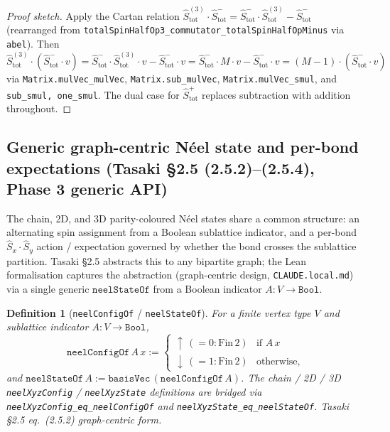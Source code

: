 \documentclass[a4paper,11pt]{article}
\newtheorem{definition}[theorem]{Definition}
\begin{document}
\begin{proof}[Proof sketch]
Apply the Cartan relation $\hat S_{\mathrm{tot}}^{(3)} \cdot \hat
S_{\mathrm{tot}}^{-} = \hat S_{\mathrm{tot}}^{-} \cdot \hat
S_{\mathrm{tot}}^{(3)} - \hat S_{\mathrm{tot}}^{-}$ (rearranged from
\texttt{totalSpinHalfOp3\_commutator\_totalSpinHalfOpMinus} via
\texttt{abel}).  Then $\hat S_{\mathrm{tot}}^{(3)} \cdot
(\hat S_{\mathrm{tot}}^{-} \cdot v)
= \hat S_{\mathrm{tot}}^{-} \cdot \hat S_{\mathrm{tot}}^{(3)} \cdot v
- \hat S_{\mathrm{tot}}^{-} \cdot v
= \hat S_{\mathrm{tot}}^{-} \cdot M \cdot v
- \hat S_{\mathrm{tot}}^{-} \cdot v
= (M-1) \cdot (\hat S_{\mathrm{tot}}^{-} \cdot v)$ via
\texttt{Matrix.mulVec\_mulVec}, \texttt{Matrix.sub\_mulVec},
\texttt{Matrix.mulVec\_smul}, and \texttt{sub\_smul, one\_smul}.
The dual case for $\hat S_{\mathrm{tot}}^{+}$ replaces subtraction
with addition throughout.
\end{proof}

\subsection{Generic graph-centric Néel state and per-bond
expectations (Tasaki §2.5 (2.5.2)--(2.5.4), Phase 3 generic API)}
\label{subsec:neel-state-of}

The chain, 2D, and 3D parity-coloured Néel states share a common
structure: an alternating spin assignment from a Boolean
sublattice indicator, and a per-bond $\hat S_x \cdot \hat S_y$
action / expectation governed by whether the bond crosses the
sublattice partition.  Tasaki §2.5 abstracts this to any bipartite
graph; the Lean formalisation captures the abstraction
(graph-centric design, \texttt{CLAUDE.local.md}) via a single
generic $\texttt{neelStateOf}$ from a Boolean indicator
$A : V \to \texttt{Bool}$.

\begin{definition}[\texttt{neelConfigOf} / \texttt{neelStateOf}]
For a finite vertex type $V$ and sublattice indicator
$A : V \to \texttt{Bool}$,
\[
  \texttt{neelConfigOf}\,A\,x := \begin{cases}
    \uparrow\,(=0:\mathrm{Fin}\,2) & \text{if } A\,x \\
    \downarrow\,(=1:\mathrm{Fin}\,2) & \text{otherwise,}
  \end{cases}
\]
and $\texttt{neelStateOf}\,A := \texttt{basisVec}\,(\texttt{neelConfigOf}\,A)$.
The chain / 2D / 3D \texttt{neelXyzConfig} / \texttt{neelXyzState}
definitions are bridged via \texttt{neelXyzConfig\_eq\_neelConfigOf}
and \texttt{neelXyzState\_eq\_neelStateOf}.  Tasaki §2.5
eq.~(2.5.2) graph-centric form.
\end{definition}
\end{document}
